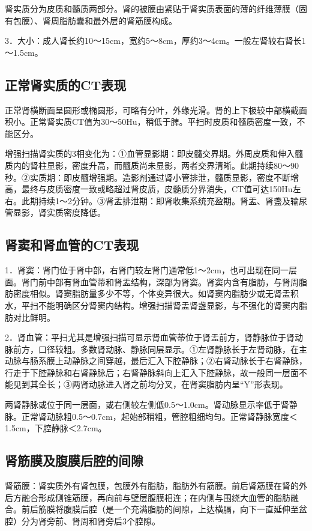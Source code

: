 肾实质分为皮质和髓质两部分。肾的被膜由紧贴于肾实质表面的薄的纤维薄膜（固有包膜）、肾周脂肪囊和最外层的肾筋膜构成。

3．大小：成人肾长约10～15cm，宽约5～8cm，厚约3～4cm。一般左肾较右肾长1～1.5cm。

\subsection{正常肾实质的CT表现}

正常肾横断面呈圆形或椭圆形，可略有分叶，外缘光滑。肾的上下极较中部横截面积小。正常肾实质CT值为30～50Hu，稍低于脾。平扫时皮质和髓质密度一致，不能区分。

增强扫描肾实质的3相变化为：①血管显影期：即皮髓交界期。外周皮质和伸入髓质内的肾柱显影，密度升高，而髓质尚未显影，两者交界清晰。此期持续80～90秒。②实质期：即皮髓增强期。造影剂通过肾小管排泄，髓质显影，密度不断增高，最终与皮质密度一致或略超过肾皮质，皮髓质分界消失，CT值可达150Hu左右。此期持续1～2分钟。③肾盂排泄期：即肾收集系统充盈期。肾盂、肾盏及输尿管显影，肾实质密度降低。

\subsection{肾窦和肾血管的CT表现}

1．肾窦：肾门位于肾中部，右肾门较左肾门通常低1～2cm，也可出现在同一层面。肾门前中部有肾血管蒂和肾盂结构，深部为肾窦。肾窦内含有脂肪，与肾周脂肪密度相似。肾窦脂肪量多少不等，个体变异很大。如肾窦内脂肪少或无肾盂积水，平扫不能明确区分肾窦内结构。增强扫描肾盂肾盏显影，与不强化的肾窦内脂肪对比鲜明。

2．肾血管：平扫尤其是增强扫描可显示肾血管蒂位于肾盂前方，肾静脉位于肾动脉前方，口径较粗。多数肾动脉、静脉同层显示。①左肾静脉长于左肾动脉，在主动脉与肠系膜上动静脉之间穿越，最后汇入下腔静脉；②右肾动脉长于右肾静脉，行走于下腔静脉和右肾静脉后；右肾静脉斜向上汇入下腔静脉，故一般同一层面不能见到其全长；③两肾动脉进入肾之前均分叉，在肾窦脂肪内呈“Y”形表现。

两肾静脉或位于同一层面，或右侧较左侧低0.5～1.0cm。肾动脉显示率低于肾静脉。正常肾动脉粗0.5～0.7cm，起始部稍粗，管腔粗细均匀。正常肾静脉宽度＜1.5cm，下腔静脉＜2.7cm。

\subsection{肾筋膜及腹膜后腔的间隙}

肾筋膜：肾实质外有肾包膜，包膜外有脂肪，脂肪外有筋膜。前后肾筋膜在肾的外后方融合形成侧锥筋膜，再向前与壁层腹膜相连；在内侧与围绕大血管的脂肪融合。前后筋膜将腹膜后腔（是一个充满脂肪的间隙，上达横膈，向下一直延伸至盆腔）分为肾旁前、肾周和肾旁后3个腔隙。

